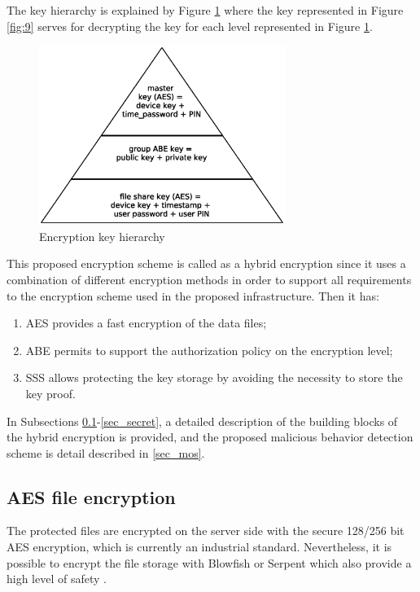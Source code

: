 \documentclass[twocolumn]{svjour3}          	%
\begin{document}
The key hierarchy is explained by Figure \ref{fig:10} where the key represented in Figure \ref{fig:9} serves for decrypting the key for each level represented in Figure \ref{fig:10}.

\begin{figure}[h!]
	\centering
	\includegraphics[width=8cm]{figures/encryptionkeyhierarchy.eps}
	\caption{Encryption key hierarchy}
	\label{fig:10}
\end{figure}

This proposed encryption scheme is called as a hybrid encryption since it uses a combination of different encryption methods in order to support all requirements to the encryption scheme used in the proposed infrastructure. Then it has:

\begin{enumerate}
	\item AES provides a fast encryption of the data files;
	\item ABE permits to support the authorization policy on the encryption level;
	\item SSS allows protecting the key storage by avoiding the necessity to store the key proof.
\end{enumerate}

In Subsections \ref{sec_aes}-\ref{sec_secret}, a detailed description of the building blocks of the hybrid encryption is provided, and the proposed malicious behavior detection scheme is detail described in \ref{sec_mos}.

\subsection{AES file encryption }
\label{sec_aes}
The protected files are encrypted on the server side with the secure 128/256 bit AES encryption, which is currently an industrial standard. Nevertheless, it is possible to encrypt the file storage with Blowfish or Serpent which also provide a high level of safety \cite{nist2000}. 
\end{document}
